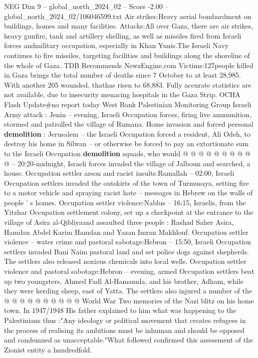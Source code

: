 \begin{textsample}{NEG Dim 9 – global\_north\_2024\_02 – Score -2.00 – global\_north\_2024\_02/106046599.txt}  \label{ex:f9_neg_240}
Air strikes:Heavy aerial bombardment on buildings, homes and many facilities.
Attacks:All over Gaza, there are air strikes, heavy gunfire, tank and artillery shelling, as well as missiles fired from Israeli forces andmilitary occupation, especially in Khan Yunis.The Israeli Navy continues to fire missiles, targeting facilities and buildings along the shoreline of the whole of Gaza.
TDB Recommends NewzEngine.com Victims:127people killed in Gaza brings the total number of deaths since 7 October to at least 28,985.
With another 205 wounded, thathas risen to 68,883.
Fully accurate statistics are not available, due to insecurity menacing hospitals in the Gaza Strip.
OCHA Flash Update\#no report today West Bank Palestinian Monitoring Group Israeli Army attack : Jenin -- evening, Israeli Occupation forces, firing live ammunition, stormed and patrolled the village of Rumana.
Home invasion and forced personal \textbf{demolition} : Jerusalem -- the Israeli Occupation forced a resident, Ali Odeh, to destroy his home in Silwan -- or otherwise be forced to pay an extortionate sum to the Israeli Occupation \textbf{demolition} squads, who would @ @ @ @ @ @ @ @ @ @ -- 20:20-midnight, Israeli forces invaded the village of Jalboun and searched, a house.
Occupation settler arson and racist insults:Ramallah -- 02:00, Israeli Occupation settlers invaded the outskirts of the town of Turmusaya, setting fire to a motor vehicle and spraying racist hate -- messages in Hebrew on the walls of people ' s homes.
Occupation settler violence:Nablus -- 16:15, Israelis, from the Yitzhar Occupation settlement colony, set up a checkpoint at the entrance to the village of Asira al-Qibliyaand assaulted three people : Rashad Saher Asira, Hamdan Abdel Karim Hamdan and Yazan Imran Makhlouf.
Occupation settler violence -- water crime and pastoral sabotage:Hebron -- 15:50, Israeli Occupation settlers invaded Bani Naim pastoral land and set police dogs against shepherds.
The settlers also released noxious chemicals into local wells.
Occupation settler violence and pastoral sabotage:Hebron -- evening, armed Occupation settlers beat up two youngsters, Ahmed Fadl Al-Hamamda, and his brother, Adham, while they were herding sheep, east of Yatta.
The settlers also injured a number of the @ @ @ @ @ @ @ @ @ @ World War Two memories of the Nazi blitz on his home town.
In 1947/1948 His father explained to him what was happening to the Palestinians thus :"Any ideology or political movement that creates refugees in the process of realising its ambitions must be inhuman and should be opposed and condemned as unacceptable."What followed confirmed this assessment of the Zionist entity a hundredfold.

\end{textsample}
